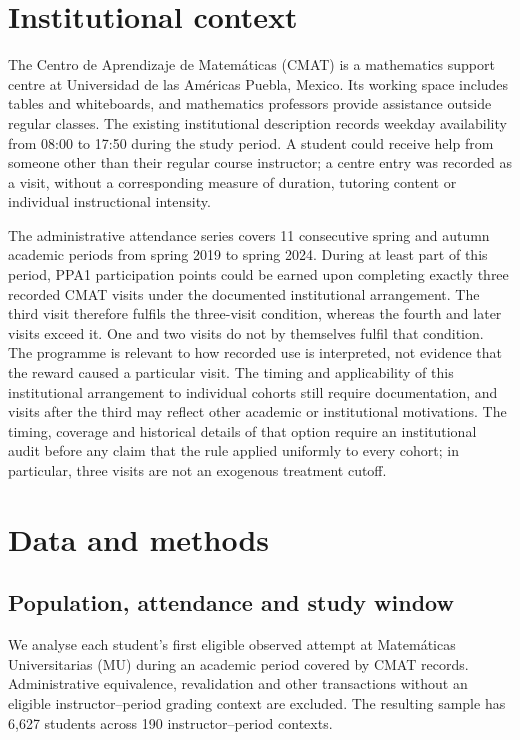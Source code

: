 \section{Institutional context}

The Centro de Aprendizaje de Matem\'aticas (CMAT) is a mathematics support centre at Universidad de las Am\'ericas Puebla, Mexico. Its working space includes tables and whiteboards, and mathematics professors provide assistance outside regular classes. The existing institutional description records weekday availability from 08:00 to 17:50 during the study period. A student could receive help from someone other than their regular course instructor; a centre entry was recorded as a visit, without a corresponding measure of duration, tutoring content or individual instructional intensity.

The administrative attendance series covers 11 consecutive spring and autumn academic periods from spring 2019 to spring 2024. During at least part of this period, PPA1 participation points could be earned upon completing exactly three recorded CMAT visits under the documented institutional arrangement. The third visit therefore fulfils the three-visit condition, whereas the fourth and later visits exceed it. One and two visits do not by themselves fulfil that condition. The programme is relevant to how recorded use is interpreted, not evidence that the reward caused a particular visit. The timing and applicability of this institutional arrangement to individual cohorts still require documentation, and visits after the third may reflect other academic or institutional motivations. The timing, coverage and historical details of that option require an institutional audit before any claim that the rule applied uniformly to every cohort; in particular, three visits are not an exogenous treatment cutoff.

\section{Data and methods}

\subsection{Population, attendance and study window}

We analyse each student's first eligible observed attempt at Matem\'aticas Universitarias (MU) during an academic period covered by CMAT records. Administrative equivalence, revalidation and other transactions without an eligible instructor--period grading context are excluded. The resulting sample has 6,627 students across 190 instructor--period contexts.

